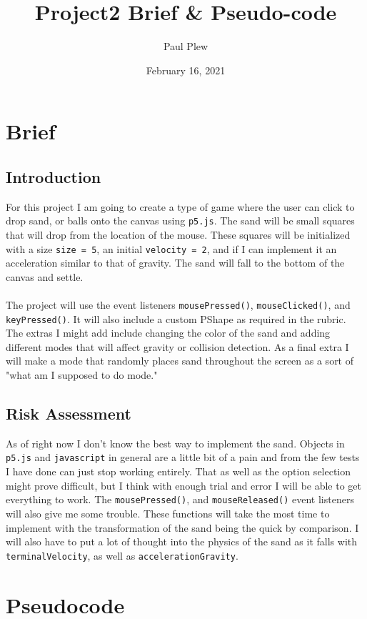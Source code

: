 \documentclass[12 pt]{report}
\title{Project2 Brief \& Pseudo-code}
\author{Paul Plew}
\date{February 16, 2021}
\begin{document}
\maketitle

\section{Brief}
\subsection{Introduction}
For this project I am going to create a type of game where the user can click to drop sand, or balls onto the canvas using \verb|p5.js|. The sand will be small squares that will drop from the location of the mouse. These squares will be initialized with a size \verb|size = 5|, an initial \verb|velocity = 2|, and if I can implement it an  acceleration similar to that of gravity. The sand will fall to the bottom of the canvas and settle. \\ \\
The project will use the event listeners \verb|mousePressed()|, \verb|mouseClicked()|, and \verb|keyPressed()|. It will also include a custom PShape as required in the rubric. The extras I might add include changing the color of the sand and adding different modes that will affect gravity or collision detection. As a final extra I will make a mode that randomly places sand throughout the screen as a sort of "what am I supposed to do mode." 
\subsection{Risk Assessment}
As of right now I don't know the best way to implement the sand. Objects in \verb|p5.js| and \verb|javascript| in general are a little bit of a pain and from the few tests I have done can just stop working entirely. That as well as the option selection might prove difficult, but I think with enough trial and error I will be able to get everything to work. The \verb|mousePressed()|, and \verb|mouseReleased()| event listeners will also give me some trouble. These functions will take the most time to implement with the transformation of the sand being the quick by comparison. I will also have to put a lot of thought into the physics of the sand as it falls with \verb|terminalVelocity|, as well as \verb|accelerationGravity|.
\newpage
\section{Pseudocode}
\end{document}
